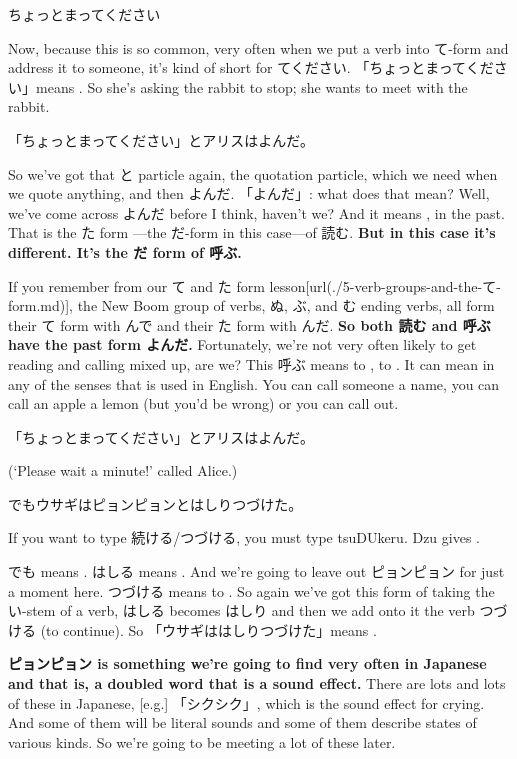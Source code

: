 \startblockquote
ちょっとまってください
\stopblockquote

Now, because this is so common, very often when we put a verb into て-form and address it to someone, it's kind of short for てください. 「ちょっとまってください」means . So she's asking the rabbit to stop; she wants to meet with the rabbit.

「ちょっとまってください」とアリスはよんだ。

So we've got that と particle again, the quotation particle, which we need when we quote anything, and then よんだ. 「よんだ」: what does that mean? Well, we've come across よんだ before I think, haven't we? And it means ,  in the past. That is the た form ---the だ-form in this case---of 読む. {\bf But in this case it's different. It's the だ form of 呼ぶ.}

{}

If you remember from our て and た form lesson\goto{{[}5{]}}[url(./5-verb-groups-and-the-て-form.md)], the New Boom group of verbs, ぬ, ぶ, and む ending verbs, all form their て form with んで and their た form with んだ. {\bf So both 読む and 呼ぶ have the past form よんだ.} Fortunately, we're not very often likely to get reading and calling mixed up, are we? This 呼ぶ means to , to . It can mean  in any of the senses that  is used in English. You can call someone a name, you can call an apple a lemon (but you'd be wrong) or you can call out.

「ちょっとまってください」とアリスはよんだ。

(‘Please wait a minute!' called Alice.)

でもウサギはピョンピョンとはしりつづけた。

{}

If you want to type 続ける/つづける, you must type tsuDUkeru. Dzu gives .

でも means . はしる means . And we're going to leave out ピョンピョン for just a moment here. つづける means to . So again we've got this form of taking the い-stem of a verb, はしる becomes はしり and then we add onto it the verb つづける (to continue). So 「ウサギははしりつづけた」means .

\thinrule

{\bf ピョンピョン is something we're going to find very often in Japanese and that is, a doubled word that is a sound effect.} There are lots and lots of these in Japanese, {[}e.g.{]} 「シクシク」, which is the sound effect for crying. And some of them will be literal sounds and some of them describe states of various kinds. So we're going to be meeting a lot of these later.

